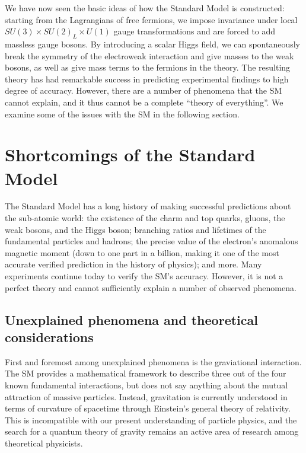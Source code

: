 We have now seen the basic ideas of how the Standard Model is constructed: starting from the Lagrangians
of free fermions, we impose invariance under local $SU(3)\times SU(2)_L\times U(1)$ gauge transformations
and are forced to add massless gauge bosons. By introducing a scalar Higgs field, we can spontaneously 
break the symmetry of the electroweak interaction and give masses to the weak bosons, as well as
give mass terms to the fermions in the theory. The resulting theory has had remarkable success in
predicting experimental findings to high degree of accuracy. However, there are a number of phenomena
that the SM cannot explain, and it thus cannot be a complete ``theory of everything''. We examine some
of the issues with the SM in the following section.


\section{Shortcomings of the Standard Model}
The Standard Model has a long history of making successful predictions about the sub-atomic
world: the existence of the charm and top quarks, gluons, the weak bosons, and the Higgs boson;
branching ratios and lifetimes of the fundamental particles and hadrons; the precise value of the
electron's anomalous magnetic moment (down to one part in a billion, making it one of the most accurate
verified prediction in the history of physics); and more. Many experiments continue today to verify the SM's
accuracy. However, it is not a perfect theory and cannot sufficiently explain a number of observed
phenomena.

\subsection{Unexplained phenomena and theoretical considerations}

First and foremost among unexplained phenomena is the graviational interaction. 
The SM provides a mathematical framework to describe
three out of the four known fundamental interactions, but does not say anything about the mutual attraction
of massive particles. Instead, gravitation is currently understood in terms of curvature of spacetime
through Einstein's general theory of relativity. This is incompatible with our present understanding of
particle physics, and the search for a quantum theory of gravity remains an active area
of research among theoretical physicists.

